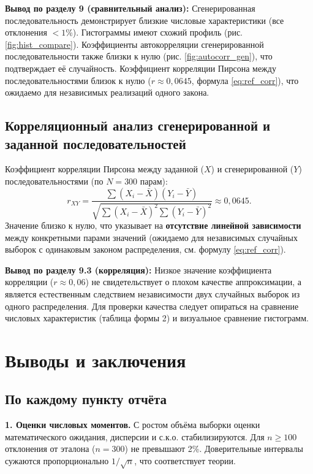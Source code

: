 \documentclass[a4paper,12pt]{article}
\begin{document}
\textbf{Вывод по разделу 9 (сравнительный анализ):} Сгенерированная последовательность демонстрирует близкие числовые характеристики (все отклонения $<1$\%). Гистограммы имеют схожий профиль (рис. \ref{fig:hist_compare}). Коэффициенты автокорреляции сгенерированной последовательности также близки к нулю (рис. \ref{fig:autocorr_gen}), что подтверждает её случайность. Коэффициент корреляции Пирсона между последовательностями близок к нулю ($r \approx 0{,}0645$, формула \ref{eq:ref_corr}), что ожидаемо для независимых реализаций одного закона.

\subsection{Корреляционный анализ сгенерированной и заданной последовательностей}

Коэффициент корреляции Пирсона между заданной ($X$) и сгенерированной ($Y$) последовательностями (по $N=300$ парам):
\begin{equation*}
r_{XY} = \frac{\sum (X_i - \bar{X})(Y_i - \bar{Y})}{\sqrt{\sum (X_i - \bar{X})^2 \sum (Y_i - \bar{Y})^2}} \approx 0{,}0645.
\end{equation*}
Значение близко к нулю, что указывает на \textbf{отсутствие линейной зависимости} между конкретными парами значений (ожидаемо для независимых случайных выборок с одинаковым законом распределения, см. формулу \ref{eq:ref_corr}).

\textbf{Вывод по разделу 9.3 (корреляция):} Низкое значение коэффициента корреляции ($r \approx 0{,}06$) не свидетельствует о плохом качестве аппроксимации, а является естественным следствием независимости двух случайных выборок из одного распределения. Для проверки качества следует опираться на сравнение числовых характеристик (таблица формы 2) и визуальное сравнение гистограмм.

\section{Выводы и заключения}

\subsection{По каждому пункту отчёта}

\textbf{1. Оценки числовых моментов.} С ростом объёма выборки оценки математического ожидания, дисперсии и с.к.о. стабилизируются. Для $n \geq 100$ отклонения от эталона ($n=300$) не превышают 2\%. Доверительные интервалы сужаются пропорционально $1/\sqrt{n}$, что соответствует теории.
\end{document}

